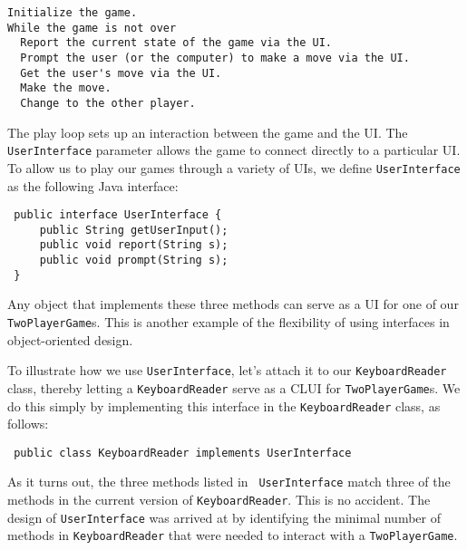 \begin{jjjlisting}[27pc]
\begin{lstlisting}[stringstyle=\color{black}]
Initialize the game.
While the game is not over 
  Report the current state of the game via the UI.
  Prompt the user (or the computer) to make a move via the UI.
  Get the user's move via the UI.
  Make the move.
  Change to the other player.
\end{lstlisting}
\end{jjjlisting}

\noindent The play loop sets up an interaction between the game and
the UI.  The {\tt UserInterface} parameter allows the game to connect
directly to a particular UI.  To allow us to play our games through a
variety of UIs, we define {\tt UserInterface} as the following Java
interface:

\begin{jjjlisting}
\begin{lstlisting}
 public interface UserInterface {
     public String getUserInput();
     public void report(String s);
     public void prompt(String s);
 }
\end{lstlisting}
\end{jjjlisting}

\noindent Any object that implements these three methods can serve as
a UI for one of our {\tt TwoPlayerGame}s.  This is another example of
the flexibility of using interfaces in object-oriented design.  

To illustrate how we use {\tt UserInterface}, let's attach it to our
{\tt KeyboardReader} class, thereby letting a {\tt KeyboardReader}
serve as a CLUI for {\tt TwoPlayerGame}s. We do this simply by
implementing this interface in the {\tt KeyboardReader} class, as
follows:

\begin{jjjlisting}
\begin{lstlisting}
 public class KeyboardReader implements UserInterface
\end{lstlisting}
\end{jjjlisting}

\noindent As it turns out, the three methods listed in {\tt
UserInterface} match three of the methods in the current
version of {\tt KeyboardReader}.  This is no accident. The design of
{\tt UserInterface} was arrived at by identifying the minimal number
of methods in {\tt KeyboardReader} that were needed to interact with a
{\tt TwoPlayerGame}.



